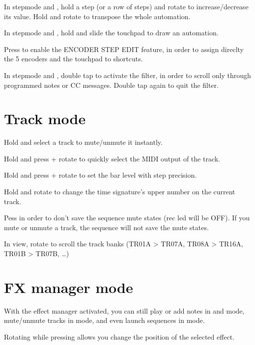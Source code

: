 In stepmode  and , hold a step \padsicon{} (or a row of steps) and rotate \encodericon{} to increase/decrease its value. Hold  and rotate \encodericon{} to transpose the whole automation.

In stepmode  and , hold  and slide the touchpad to draw an automation.

Press  to enable the ENCODER STEP EDIT feature, in order to assign direclty the 5 encoders and the touchpad to shortcuts.

In stepmode  and , double tap  to activate the filter, in order to scroll only through programmed notes or CC messages. Double tap  again to quit the filter.


\section{Track mode}

Hold  and select a track \padsicon{} to mute/unmute it instantly.

Hold  and press + rotate \encodericon{} to quickly select the MIDI output of the track.

Hold  and press + rotate \encodericon{} to set the bar level with step precision.

Hold  and rotate \encodericon{} to change the time signature's upper number on the current track.

Pess  in order to don't save the sequence mute states (rec led will be OFF). If you mute or unmute a track, the sequence will not save the mute states.

In  view, rotate \encodericon{} to scroll the track banks (TR01A > TR07A, TR08A > TR16A, TR01B > TR07B, \ldots)


\section{FX manager mode}

With the effect manager activated, you can still play or add notes in  and  mode, mute/unmute tracks in  mode, and even launch sequences in  mode.

Rotating \encodericon{} while pressing  allows you change the position of the selected effect.

